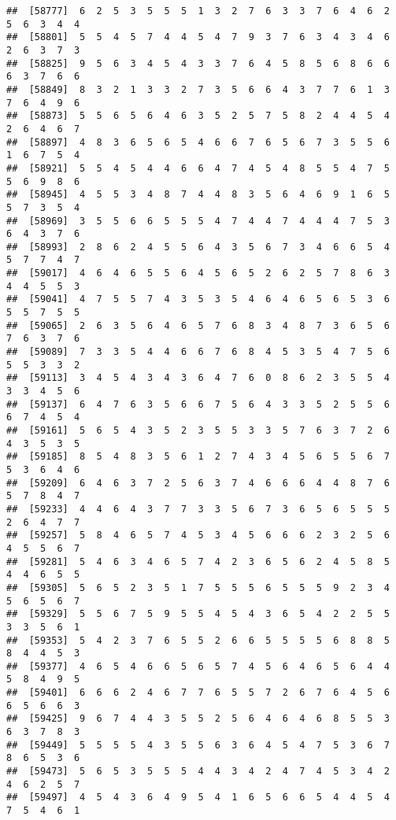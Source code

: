 \documentclass[
]{book}
\begin{document}
\begin{verbatim}
##  [58777]  6  2  5  3  5  5  5  1  3  2  7  6  3  3  7  6  4  6  2  5  6  3  4  4
##  [58801]  5  5  4  5  7  4  4  5  4  7  9  3  7  6  3  4  3  4  6  2  6  3  7  3
##  [58825]  9  5  6  3  4  5  4  3  3  7  6  4  5  8  5  6  8  6  6  6  3  7  6  6
##  [58849]  8  3  2  1  3  3  2  7  3  5  6  6  4  3  7  7  6  1  3  7  6  4  9  6
##  [58873]  5  5  6  5  6  4  6  3  5  2  5  7  5  8  2  4  4  5  4  2  6  4  6  7
##  [58897]  4  8  3  6  5  6  5  4  6  6  7  6  5  6  7  3  5  5  6  1  6  7  5  4
##  [58921]  5  5  4  5  4  4  6  6  4  7  4  5  4  8  5  5  4  7  5  5  6  9  8  6
##  [58945]  4  5  5  3  4  8  7  4  4  8  3  5  6  4  6  9  1  6  5  5  7  3  5  4
##  [58969]  3  5  5  6  6  5  5  5  4  7  4  4  7  4  4  4  7  5  3  6  4  3  7  6
##  [58993]  2  8  6  2  4  5  5  6  4  3  5  6  7  3  4  6  6  5  4  5  7  7  4  7
##  [59017]  4  6  4  6  5  5  6  4  5  6  5  2  6  2  5  7  8  6  3  4  4  5  5  3
##  [59041]  4  7  5  5  7  4  3  5  3  5  4  6  4  6  5  6  5  3  6  5  5  7  5  5
##  [59065]  2  6  3  5  6  4  6  5  7  6  8  3  4  8  7  3  6  5  6  7  6  3  7  6
##  [59089]  7  3  3  5  4  4  6  6  7  6  8  4  5  3  5  4  7  5  6  5  5  3  3  2
##  [59113]  3  4  5  4  3  4  3  6  4  7  6  0  8  6  2  3  5  5  4  3  3  4  5  6
##  [59137]  6  4  7  6  3  5  6  6  7  5  6  4  3  3  5  2  5  5  6  6  7  4  5  4
##  [59161]  5  6  5  4  3  5  2  3  5  5  3  3  5  7  6  3  7  2  6  4  3  5  3  5
##  [59185]  8  5  4  8  3  5  6  1  2  7  4  3  4  5  6  5  5  6  7  5  3  6  4  6
##  [59209]  6  4  6  3  7  2  5  6  3  7  4  6  6  6  4  4  8  7  6  5  7  8  4  7
##  [59233]  4  4  6  4  3  7  7  3  3  5  6  7  3  6  5  6  5  5  5  2  6  4  7  7
##  [59257]  5  8  4  6  5  7  4  5  3  4  5  6  6  6  2  3  2  5  6  4  5  5  6  7
##  [59281]  5  4  6  3  4  6  5  7  4  2  3  6  5  6  2  4  5  8  5  4  4  6  5  5
##  [59305]  5  6  5  2  3  5  1  7  5  5  5  6  5  5  5  9  2  3  4  5  6  5  6  7
##  [59329]  5  5  6  7  5  9  5  5  4  5  4  3  6  5  4  2  2  5  5  3  3  5  6  1
##  [59353]  5  4  2  3  7  6  5  5  2  6  6  5  5  5  5  6  8  8  5  8  4  4  5  3
##  [59377]  4  6  5  4  6  6  5  6  5  7  4  5  6  4  6  5  6  4  4  5  8  4  9  5
##  [59401]  6  6  6  2  4  6  7  7  6  5  5  7  2  6  7  6  4  5  6  6  5  6  6  3
##  [59425]  9  6  7  4  4  3  5  5  2  5  6  4  6  4  6  8  5  5  3  6  3  7  8  3
##  [59449]  5  5  5  5  4  3  5  5  6  3  6  4  5  4  7  5  3  6  7  8  6  5  3  6
##  [59473]  5  6  5  3  5  5  5  4  4  3  4  2  4  7  4  5  3  4  2  4  6  2  5  7
##  [59497]  4  5  4  3  6  4  9  5  4  1  6  5  6  6  5  4  4  5  4  7  5  4  6  1

\end{verbatim}
\end{document}

